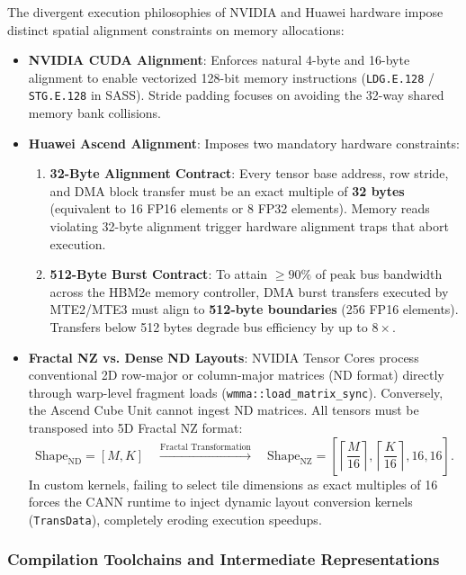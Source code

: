 The divergent execution philosophies of NVIDIA and Huawei hardware impose distinct spatial alignment constraints on memory allocations:
\begin{itemize}
    \item \textbf{NVIDIA CUDA Alignment}: Enforces natural 4-byte and 16-byte alignment to enable vectorized 128-bit memory instructions (\texttt{LDG.E.128} / \texttt{STG.E.128} in SASS). Stride padding focuses on avoiding the 32-way shared memory bank collisions.
    \item \textbf{Huawei Ascend Alignment}: Imposes two mandatory hardware constraints:
    \begin{enumerate}
        \item \textbf{32-Byte Alignment Contract}: Every tensor base address, row stride, and DMA block transfer must be an exact multiple of \textbf{32 bytes} (equivalent to 16 FP16 elements or 8 FP32 elements). Memory reads violating 32-byte alignment trigger hardware alignment traps that abort execution.
        \item \textbf{512-Byte Burst Contract}: To attain $\ge 90\%$ of peak bus bandwidth across the HBM2e memory controller, DMA burst transfers executed by MTE2/MTE3 must align to \textbf{512-byte boundaries} (256 FP16 elements). Transfers below 512 bytes degrade bus efficiency by up to $8\times$.
    \end{enumerate}
    \item \textbf{Fractal NZ vs. Dense ND Layouts}: NVIDIA Tensor Cores process conventional 2D row-major or column-major matrices (ND format) directly through warp-level fragment loads (\texttt{wmma::load\_matrix\_sync}). Conversely, the Ascend Cube Unit cannot ingest ND matrices. All tensors must be transposed into 5D Fractal NZ format:
    \begin{equation}
        \text{Shape}_{\text{ND}} = [M, K] \quad \xrightarrow{\text{Fractal Transformation}} \quad \text{Shape}_{\text{NZ}} = \left[ \left\lceil \frac{M}{16} \right\rceil, \left\lceil \frac{K}{16} \right\rceil, 16, 16 \right].
    \end{equation}
    In custom kernels, failing to select tile dimensions as exact multiples of 16 forces the CANN runtime to inject dynamic layout conversion kernels (\texttt{TransData}), completely eroding execution speedups.
\end{itemize}

\subsubsection{Compilation Toolchains and Intermediate Representations}
\label{sec:appendix_compilation_toolchains}

